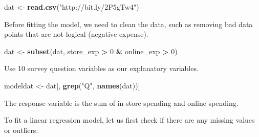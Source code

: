\documentclass[12pt,]{krantz}
\makeatletter
\newenvironment{Shaded}{\begin{snugshade}}{\end{snugshade}}
\newcommand{\CommentTok}[1]{\textcolor[rgb]{0.37,0.37,0.37}{\textit{#1}}}
\newcommand{\DataTypeTok}[1]{\textcolor[rgb]{0.27,0.27,0.27}{#1}}
\newcommand{\DecValTok}[1]{\textcolor[rgb]{0.06,0.06,0.06}{#1}}
\newcommand{\KeywordTok}[1]{\textcolor[rgb]{0.27,0.27,0.27}{\textbf{#1}}}
\newcommand{\NormalTok}[1]{#1}
\newcommand{\OperatorTok}[1]{\textcolor[rgb]{0.43,0.43,0.43}{\textbf{#1}}}
\newcommand{\StringTok}[1]{\textcolor[rgb]{0.5,0.5,0.5}{#1}}
\newenvironment{kframe}{%
\medskip{}
\setlength{\fboxsep}{.8em}
 \def\at@end@of@kframe{}%
 \ifinner\ifhmode%
  \def\at@end@of@kframe{\end{minipage}}%
  \begin{minipage}{\columnwidth}%
 \fi\fi%
 \def\FrameCommand##1{\hskip\@totalleftmargin \hskip-\fboxsep
 \colorbox{shadecolor}{##1}\hskip-\fboxsep
     \hskip-\linewidth \hskip-\@totalleftmargin \hskip\columnwidth}%
 \MakeFramed {\advance\hsize-\width
   \@totalleftmargin\z@ \linewidth\hsize
   \@setminipage}}%
 {\par\unskip\endMakeFramed%
 \at@end@of@kframe}
\renewenvironment{Shaded}{\begin{kframe}}{\end{kframe}}
\makeatother
\begin{document}
\begin{Shaded}
\begin{Highlighting}[]
\NormalTok{dat <-}\StringTok{ }\KeywordTok{read.csv}\NormalTok{(}\StringTok{"http://bit.ly/2P5gTw4"}\NormalTok{)}
\end{Highlighting}
\end{Shaded}

Before fitting the model, we need to clean the data, such as removing bad data points that are not logical (negative expense).

\begin{Shaded}
\begin{Highlighting}[]
\NormalTok{dat <-}\StringTok{ }\KeywordTok{subset}\NormalTok{(dat, store_exp }\OperatorTok{>}\StringTok{ }\DecValTok{0} \OperatorTok{&}\StringTok{ }\NormalTok{online_exp }\OperatorTok{>}\StringTok{ }\DecValTok{0}\NormalTok{)}
\end{Highlighting}
\end{Shaded}

Use 10 survey question variables as our explanatory variables.

\begin{Shaded}
\begin{Highlighting}[]
\NormalTok{modeldat <-}\StringTok{ }\NormalTok{dat[, }\KeywordTok{grep}\NormalTok{(}\StringTok{"Q"}\NormalTok{, }\KeywordTok{names}\NormalTok{(dat))]}
\end{Highlighting}
\end{Shaded}

The response variable is the sum of in-store spending and online spending.

\begin{Shaded}
\end{Shaded}

To fit a linear regression model, let us first check if there are any missing values or outliers:

\begin{Shaded}
\end{Shaded}
\end{document}
